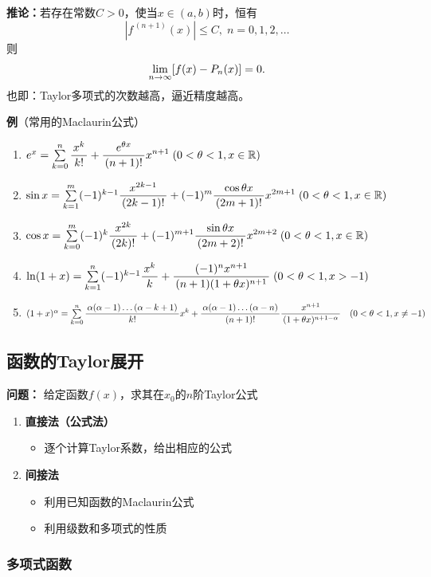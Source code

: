 {\bf 推论：}若存在常数$C>0$，使当$x\in(a,b)$时，恒有
$$|f^{\,(n+1)}(x)|\leq C,\;n=0,1,2,\ldots$$
则
$$\lim\limits_{n\to\infty} [f(x)-P_n(x)]=0.$$
也即：Taylor多项式的次数越高，逼近精度越高。

{\bf 例}（常用的Maclaurin公式）
\begin{enumerate}[(1)]
  \setlength{\itemindent}{1cm}
  \item {$e^x =\sum\limits_{k=0}^n\displaystyle\frac{\,{x^k}\,}{\,{k!}\,}
  +\displaystyle\frac{\,{e^{\theta x}}\,}{\,{(n+1)!}\,}x^{n+1}\;
  (0<\theta<1,x\in\mathbb{R})$}
  \item {$\sin x
  =\sum\limits_{k=1}^m(-1)^{k-1}\displaystyle\frac{\,{x^{2k-1}}\,}{\,{(2k-1)!}\,} 
  +(-1)^m\displaystyle\frac{\,{\cos\theta x}\,}{\,{(2m+1)!}\,}x^{2m+1}\;
  (0<\theta<1,x\in\mathbb{R})$}
  \item {$\cos x= \sum\limits_{k=0}^m(-1)^{k}\displaystyle\frac{\,{x^{2k}}\,}{\,{(2k)!}\,}
  +(-1)^{m+1}\displaystyle\frac{\,{\sin\theta
  x}\,}{\,{(2m+2)!}\,}x^{2m+2}\; (0<\theta<1,x\in\mathbb{R})$}
  \item
  {$\ln(1+x) =\sum\limits_{k=1}^n(-1)^{k-1}\displaystyle\frac{\,{x^k}\,}{\,{k}\,}
  +\displaystyle\frac{\,{(-1)^nx^{n+1}}\,}{\,{(n+1)(1+\theta
  x)^{n+1}}\,}\; (0<\theta<1,x>-1)$} 
  \item
  {$(1+x)^\alpha =\sum\limits_{k=0}^n
  \displaystyle\frac{\,{\alpha(\alpha-1)\ldots(\alpha-k+1)}\,}{\,{k!}\,}x^k
	 +\displaystyle\frac{\,{\alpha(\alpha-1)\ldots(\alpha-n)}\,}{\,{(n+1)!}\,}\displaystyle\frac{\,{x^{n+1}}\,}{\,{(1+\theta
	x)^{n+1-\alpha}}\,}\quad (0<\theta<1,x\ne -1)$}
\end{enumerate}

\subsection{函数的Taylor展开}

{\bf 问题：}{ 给定函数$f(x)$，求其在$x_0$的$n$阶Taylor公式} 
\begin{enumerate}[(1)]
  \setlength{\itemindent}{1cm}
  \item {\bf 直接法（公式法）} 
  \begin{itemize}
    \item 逐个计算Taylor系数，给出相应的公式 
  \end{itemize}
  \item {\bf 间接法} 
  \begin{itemize}
    \item 利用已知函数的Maclaurin公式 
    \item 利用级数和多项式的性质
  \end{itemize}
\end{enumerate}

\subsubsection{多项式函数}

